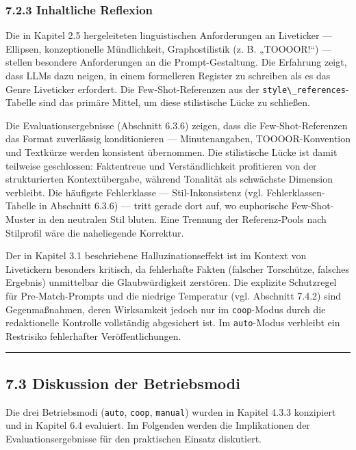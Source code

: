 \subsubsection{7.2.3 Inhaltliche Reflexion}\label{inhaltliche-reflexion}

Die in Kapitel 2.5 hergeleiteten linguistischen Anforderungen an
Liveticker --- Ellipsen, konzeptionelle Mündlichkeit, Graphostilistik
(z. B. „TOOOOR!{\kern0pt}``) --- stellen besondere Anforderungen an die
Prompt-Gestaltung. Die Erfahrung zeigt, dass LLMs dazu neigen, in einem
formelleren Register zu schreiben als es das Genre Liveticker erfordert.
Die Few-Shot-Referenzen aus der
\passthrough{\lstinline!style\_references!}-Tabelle sind das primäre
Mittel, um diese stilistische Lücke zu schließen.

Die Evaluationsergebnisse (Abschnitt 6.3.6) zeigen, dass die
Few-Shot-Referenzen das Format zuverlässig konditionieren ---
Minutenangaben, TOOOOR-Konvention und Textkürze werden konsistent
übernommen. Die stilistische Lücke ist damit teilweise geschlossen:
Faktentreue und Verständlichkeit profitieren von der strukturierten
Kontextübergabe, während Tonalität als schwächste Dimension verbleibt.
Die häufigste Fehlerklasse --- Stil-Inkonsistenz (vgl.
Fehlerklassen-Tabelle in Abschnitt 6.3.6) --- tritt gerade dort auf, wo
euphorische Few-Shot-Muster in den neutralen Stil bluten. Eine Trennung
der Referenz-Pools nach Stilprofil wäre die naheliegende Korrektur.

Der in Kapitel 3.1 beschriebene Halluzinationseffekt ist im Kontext von
Livetickern besonders kritisch, da fehlerhafte Fakten (falscher
Torschütze, falsches Ergebnis) unmittelbar die Glaubwürdigkeit
zerstören. Die explizite Schutzregel für Pre-Match-Prompts und die
niedrige Temperatur (vgl. Abschnitt 7.4.2) sind Gegenmaßnahmen, deren
Wirksamkeit jedoch nur im \passthrough{\lstinline!coop!}-Modus durch die
redaktionelle Kontrolle vollständig abgesichert ist. Im
\passthrough{\lstinline!auto!}-Modus verbleibt ein Restrisiko
fehlerhafter Veröffentlichungen.

\begin{center}\rule{0.5\linewidth}{0.5pt}\end{center}

\subsection{7.3 Diskussion der
Betriebsmodi}\label{diskussion-der-betriebsmodi}

Die drei Betriebsmodi (\passthrough{\lstinline!auto!},
\passthrough{\lstinline!coop!}, \passthrough{\lstinline!manual!}) wurden
in Kapitel 4.3.3 konzipiert und in Kapitel 6.4 evaluiert. Im Folgenden
werden die Implikationen der Evaluationsergebnisse für den praktischen
Einsatz diskutiert.

